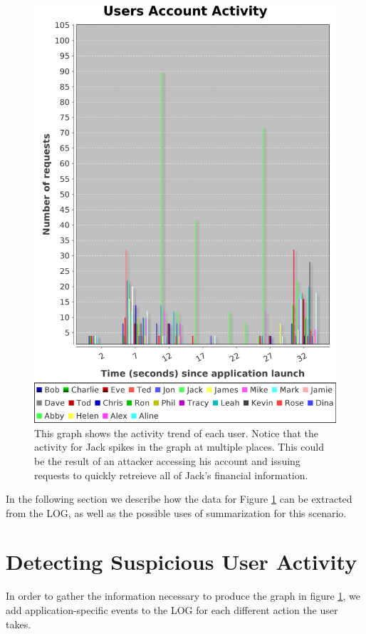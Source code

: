 \begin{figure}
\centering
\includegraphics[width=\textwidth,height=\textheight,keepaspectratio]{figures/activity}
\caption{This graph shows the activity trend of each user. Notice that the activity for Jack spikes in the graph at multiple places. This could be the result of an attacker accessing his account and issuing requests to quickly retreieve all of Jack's financial information.}
\label{fig:user-activity}
\end{figure}
In the following section we describe how the data for Figure \ref{fig:user-activity} can be extracted from the LOG, as well as the possible uses of summarization for this scenario.

\section{Detecting Suspicious User Activity}
\label{audit:mint-example}
In order to gather the information necessary to produce the graph in figure \ref{fig:user-activity}, we add application-specific events to the LOG for each different action the user takes.

